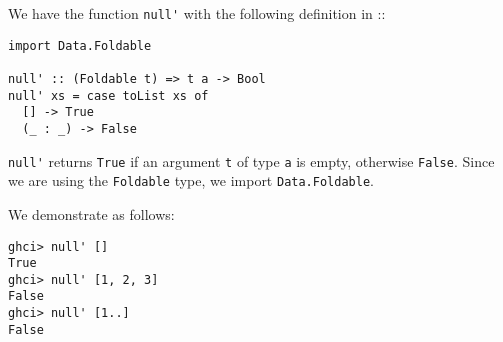 
We have the function \verb|null'| with the following definition in 
::
\scriptsize\begin{verbatim}
import Data.Foldable

null' :: (Foldable t) => t a -> Bool
null' xs = case toList xs of
  [] -> True
  (_ : _) -> False
\end{verbatim}\normalsize
\verb|null'| returns \verb|True| if an argument \verb|t| of type \verb|a| 
is empty, otherwise \verb|False|. Since we are using the \verb|Foldable| 
type, we import \verb|Data.Foldable|.\par
\qquad We demonstrate as follows:
\scriptsize\begin{verbatim}
ghci> null' []
True
ghci> null' [1, 2, 3]
False
ghci> null' [1..]
False
\end{verbatim}\normalsize
